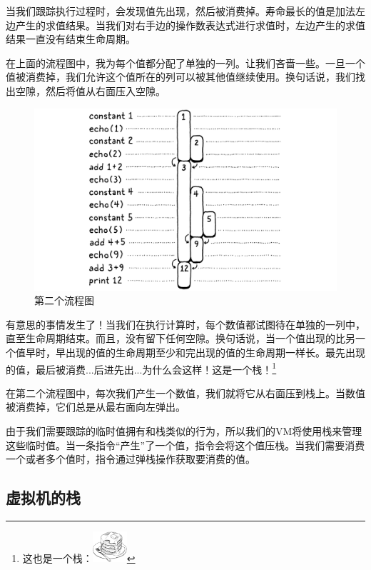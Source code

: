 \documentclass[cn,11pt,chinese]{elegantbook}
\begin{document}
当我们跟踪执行过程时，会发现值先出现，然后被消费掉。寿命最长的值是加法左边产生的求值结果。当我们对右手边的操作数表达式进行求值时，左边产生的求值结果一直没有结束生命周期。

在上面的流程图中，我为每个值都分配了单独的一列。让我们吝啬一些。一旦一个值被消费掉，我们允许这个值所在的列可以被其他值继续使用。换句话说，我们找出空隙，然后将值从右面压入空隙。

\begin{figure}[htbp]
  \centering
  \includegraphics[width=\textwidth]{image/a-virtual-machine/bars-stacked.png}
  \caption{第二个流程图}
\end{figure}

有意思的事情发生了！当我们在执行计算时，每个数值都试图待在单独的一列中，直至生命周期结束。而且，没有留下任何空隙。换句话说，当一个值出现的比另一个值早时，早出现的值的生命周期至少和完出现的值的生命周期一样长。最先出现的值，最后被消费...后进先出...为什么会这样！这是一个栈！\footnote{这也是一个栈：\includegraphics[width=0.1\textwidth]{image/a-virtual-machine/pancakes.png}}

在第二个流程图中，每次我们产生一个数值，我们就将它从右面压到栈上。当数值被消费掉，它们总是从最右面向左弹出。

由于我们需要跟踪的临时值拥有和栈类似的行为，所以我们的VM将使用栈来管理这些临时值。当一条指令“产生”了一个值，指令会将这个值压栈。当我们需要消费一个或者多个值时，指令通过弹栈操作获取要消费的值。

\subsection{虚拟机的栈}
\end{document}
